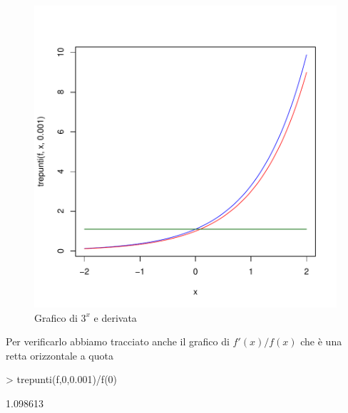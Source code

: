 \documentclass[onecolumn,11pt]{book}
\begin{document}
\begin{figure}[ htbp]
\begin{center}
\includegraphics{statisticaconR-095}
\caption{Grafico di $3^x$ e derivata}
\label{fig:der3x}
\end{center}
\end{figure}

Per verificarlo abbiamo tracciato anche il grafico di $f'(x)/f(x)$ che \`e una retta orizzontale a quota
\begin{Schunk}
\begin{Sinput}
> trepunti(f,0,0.001)/f(0)
\end{Sinput}
\begin{Soutput}
[1] 1.098613
\end{Soutput}
\end{Schunk}
\end{document}
